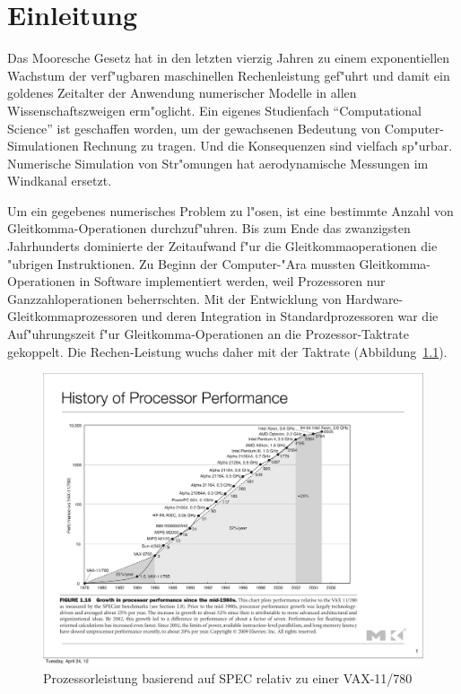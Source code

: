 \chapter{Einleitung}
Das Mooresche Gesetz hat in den letzten vierzig Jahren zu einem
exponentiellen Wachstum der verf"ugbaren maschinellen Rechenleistung
gef"uhrt und damit ein goldenes Zeitalter der Anwendung numerischer
Modelle in allen Wissenschaftszweigen erm"oglicht.
Ein eigenes Studienfach ``Computational Science'' ist geschaffen worden,
um der gewachsenen Bedeutung von Computer-Simulationen Rechnung zu
tragen. Und die Konsequenzen sind vielfach sp"urbar.
Numerische Simulation von Str"omungen hat aerodynamische Messungen
im Windkanal ersetzt.

Um ein gegebenes numerisches Problem zu l"osen, ist eine bestimmte
Anzahl von Gleit\-komma-Operationen durchzuf"uhren.
Bis zum Ende das zwanzigsten Jahrhunderts dominierte der Zeitaufwand f"ur
die Gleitkommaoperationen die "ubrigen Instruktionen.
Zu Beginn der Computer-"Ara mussten Gleitkomma-Operationen in Software
implementiert werden, weil Prozessoren nur Ganzzahloperationen 
beherrschten. Mit der Entwicklung von Hardware-Gleitkommaprozessoren
und deren Integration in Standardprozessoren war die Auf"uhrungszeit
f"ur Gleitkomma-Operationen an die Prozessor-Taktrate gekoppelt.
Die Rechen-Leistung wuchs daher mit der Taktrate
(Abbildung~\ref{processorperformance}).
\begin{figure}
\begin{center}
\includegraphics[width=\hsize]{images/processorperformance.pdf}
\end{center}
\caption{Prozessorleistung basierend auf SPEC relativ zu einer VAX-11/780}
\label{processorperformance}
\end{figure}

